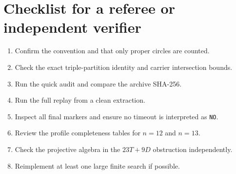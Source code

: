 \section{Checklist for a referee or independent verifier}

\begin{enumerate}
\item Confirm the convention and that only proper circles are counted.
\item Check the exact triple-partition identity and carrier intersection bounds.
\item Run the quick audit and compare the archive SHA-256.
\item Run the full replay from a clean extraction.
\item Inspect all final markers and ensure no timeout is interpreted as \texttt{NO}.
\item Review the profile completeness tables for $n=12$ and $n=13$.
\item Check the projective algebra in the $23T+9D$ obstruction independently.
\item Reimplement at least one large finite search if possible.
\end{enumerate}

